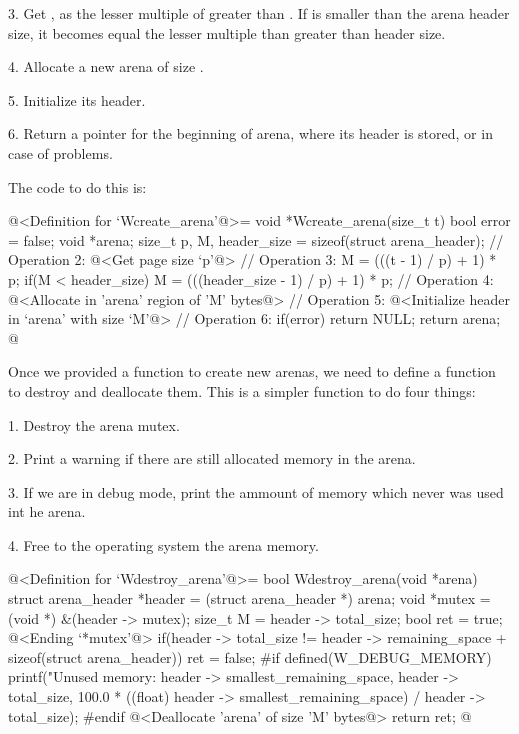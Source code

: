 3. Get , as the lesser multiple of
 greater than . If  is
smaller than the arena header size, it becomes equal the lesser
multiple than  greater than header size.

4. Allocate a new arena of size .

5. Initialize its header.

6. Return a pointer for the beginning of arena, where its header is
stored, or  in case of problems.

The code to do this is:

\iniciocodigo
@<Definition for `Wcreate\_arena'@>=
void *Wcreate_arena(size_t t){
  bool error = false;
  void *arena;
  size_t p, M, header_size = sizeof(struct arena_header);
  // Operation 2:
  @<Get page size `p'@>
  // Operation 3:
  M = (((t - 1) / p) + 1) * p;
  if(M < header_size)
    M = (((header_size - 1) / p) + 1) * p;
  // Operation 4:
  @<Allocate in 'arena' region of 'M' bytes@>
  // Operation 5:
  @<Initialize header in `arena' with size `M'@>
  // Operation 6:
  if(error) return NULL;
  return arena;
}
@
\fimcodigo


Once we provided a function to create new arenas, we need to define a
function to destroy and deallocate them. This is a simpler function to
do four things:

1. Destroy the arena mutex.

2. Print a warning if there are still allocated memory in the arena.

3. If we are in debug mode, print the ammount of memory which never
was used int he arena.

4. Free to the operating system the arena memory.

\iniciocodigo
@<Definition for `Wdestroy\_arena'@>=
bool Wdestroy_arena(void *arena){
  struct arena_header *header = (struct arena_header *) arena;
  void *mutex = (void *) &(header -> mutex);
  size_t M = header -> total_size;
  bool ret = true;
  @<Ending `*mutex'@>
  if(header -> total_size != header -> remaining_space +
     sizeof(struct arena_header))
    ret = false;
#if defined(W_DEBUG_MEMORY)
  printf("Unused memory: %
         header -> smallest_remaining_space, header -> total_size,
         100.0 *
         ((float) header -> smallest_remaining_space) / header -> total_size);
#endif
  @<Deallocate 'arena' of size 'M' bytes@>
  return ret;
}
@
\fimcodigo

